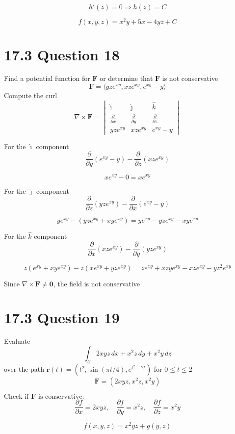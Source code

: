 \documentclass[hidelinks]{article}
\begin{document}
\[
h'(z) = 0 \Rightarrow h(z) = C
\]

\[
f(x,y,z) = x^2 y + 5x - 4yz + C
\]

\newpage
\section*{17.3 Question 18}
Find a potential function for $\textbf{F}$ or determine that $\textbf{F}$ is not conservative
\[
    \textbf{F} = \langle yze^{xy}, xze^{xy}, e^{xy} -y \rangle
\]
Compute the curl
\[
\nabla \times \mathbf{F} =
\begin{vmatrix}
\hat{\imath} & \hat{\jmath} & \hat{k} \\
\frac{\partial}{\partial x} & \frac{\partial}{\partial y} & \frac{\partial}{\partial z} \\
yze^{xy} & xze^{xy} & e^{xy} - y
\end{vmatrix}
\]

For the \(\hat{\imath}\) component
\[
\frac{\partial}{\partial y} (e^{xy} - y) - \frac{\partial}{\partial z} (xze^{xy}) 
\]

\[
xe^{xy} - 0 = xe^{xy}
\]

For the \(\hat{\jmath}\) component
\[
\frac{\partial}{\partial z} (yze^{xy}) - \frac{\partial}{\partial x} (e^{xy} - y)
\]

\[
ye^{xy} - (yze^{xy} + xye^{xy}) = ye^{xy} - yze^{xy} - xye^{xy}
\]

For the \(\hat{k}\) component
\[
\frac{\partial}{\partial x} (xze^{xy}) - \frac{\partial}{\partial y} (yze^{xy})
\]

\[
z(e^{xy} + xye^{xy}) - z(xe^{xy} + yz e^{xy}) = ze^{xy} + xzye^{xy} - xze^{xy} - yz^2 e^{xy}
\]

Since \(\nabla \times \mathbf{F} \neq \mathbf{0}\), the field is not conservative

\newpage
\section*{17.3 Question 19}
Evaluate 
\[
    \int_{\mathcal{C}} 2xyz \, dx + x^2z \, dy + x^2y \,dz
\] 
over the path $\textbf{r}(t) = (t^2, \sin(\pi t/4), e^{t^2-2t})$ for $0 \leq t \leq 2$
\[
\mathbf{F} = (2xyz, x^2z, x^2y)
\]

$\text{Check if } \mathbf{F} \text{ is conservative:}$
\[
\frac{\partial f}{\partial x} = 2xyz, \quad \frac{\partial f}{\partial y} = x^2z, \quad \frac{\partial f}{\partial z} = x^2y
\]

\[
f(x, y, z) = x^2 yz + g(y, z)
\]
\end{document}
